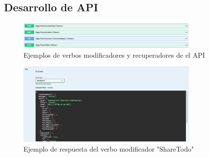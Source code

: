 \documentclass[10pt]{article}
\begin{document}
\subsection{Desarrollo de API}
\begin{figure}[H]
    \begin{center}
        \includegraphics[width=0.8\textwidth]{Imagenes/api.png}
        \caption{Ejemplos de verbos modificadores y recuperadores de el API}
        \label{4}
    \end{center}
\end{figure}
\begin{figure}[H]
    \begin{center}
        \includegraphics[width=0.8\textwidth]{Imagenes/api2.png}
        \caption{Ejemplo de respuesta del verbo modificador "ShareTodo"}
        \label{fig15}
    \end{center}
\end{figure}
\end{document}
